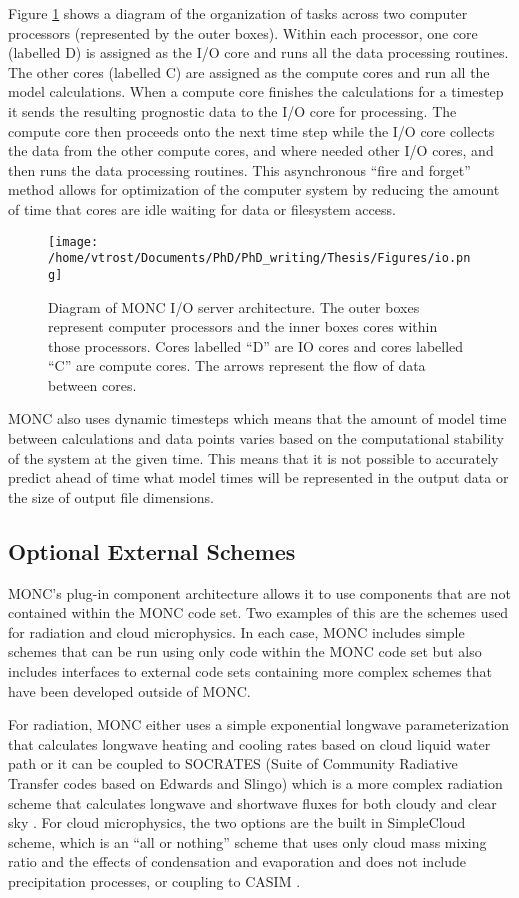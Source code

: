 Figure \ref{fig:io} shows a diagram of the organization of tasks across two computer processors (represented by the outer boxes). Within each processor, one core (labelled D) is assigned as the I/O core and runs all the data processing routines. The other cores (labelled C) are assigned as the compute cores and run all the model calculations. When a compute core finishes the calculations for a timestep it sends the resulting prognostic data to the I/O core for processing. The compute core then proceeds onto the next time step while the I/O core collects the data from the other compute cores, and where needed other I/O cores, and then runs the data processing routines. This asynchronous ``fire and forget'' method allows for optimization of the computer system by reducing the amount of time that cores are idle waiting for data or filesystem access. \citep{brown2015, brown2018}

\begin{figure}[H]
	\centering
	\texttt{[image: /home/vtrost/Documents/PhD/PhD\_writing/Thesis/Figures/io.png]}
	\caption{Diagram of MONC I/O server architecture. The outer boxes represent computer processors and the inner boxes cores within those processors. Cores labelled ``D'' are IO cores and cores labelled ``C'' are compute cores. The arrows represent the flow of data between cores. \citep[][Figure 1]{brown2018}}
	\label{fig:io}
\end{figure}

MONC also uses dynamic timesteps which means that the amount of model time between calculations and data points varies based on the computational stability of the system at the given time. This means that it is not possible to accurately predict ahead of time what model times will be represented in the output data or the size of output file dimensions. \citep{brown2018}


\subsection{Optional External Schemes}
MONC's plug-in component architecture allows it to use components that are not contained within the MONC code set. Two examples of this are the schemes used for radiation and cloud microphysics. In each case, MONC includes simple schemes that can be run using only code within the MONC code set but also includes interfaces to external code sets containing more complex schemes that have been developed outside of MONC.

For radiation, MONC either uses a simple exponential longwave parameterization that calculates longwave heating and cooling rates based on cloud liquid water path or it can be coupled to SOCRATES (Suite of Community Radiative Transfer codes based on Edwards and Slingo) which is a more complex radiation scheme that calculates longwave and shortwave fluxes for both cloudy and clear sky \citep{hill2018}. For cloud microphysics, the two options are the built in SimpleCloud scheme, which is an ``all or nothing'' scheme that uses only cloud mass mixing ratio and the effects of condensation and evaporation and does not include precipitation processes, or coupling to CASIM \citep{dear2018, hill2018}.

